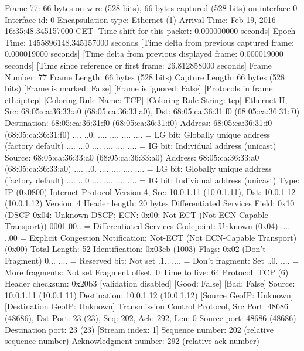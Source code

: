 Frame 77: 66 bytes on wire (528 bits), 66 bytes captured (528 bits) on interface 0
    Interface id: 0
    Encapsulation type: Ethernet (1)
    Arrival Time: Feb 19, 2016 16:35:48.345157000 CET
    [Time shift for this packet: 0.000000000 seconds]
    Epoch Time: 1455896148.345157000 seconds
    [Time delta from previous captured frame: 0.000019000 seconds]
    [Time delta from previous displayed frame: 0.000019000 seconds]
    [Time since reference or first frame: 26.812858000 seconds]
    Frame Number: 77
    Frame Length: 66 bytes (528 bits)
    Capture Length: 66 bytes (528 bits)
    [Frame is marked: False]
    [Frame is ignored: False]
    [Protocols in frame: eth:ip:tcp]
    [Coloring Rule Name: TCP]
    [Coloring Rule String: tcp]
Ethernet II, Src: 68:05:ca:36:33:a0 (68:05:ca:36:33:a0), Dst: 68:05:ca:36:31:f0 (68:05:ca:36:31:f0)
    Destination: 68:05:ca:36:31:f0 (68:05:ca:36:31:f0)
        Address: 68:05:ca:36:31:f0 (68:05:ca:36:31:f0)
        .... ..0. .... .... .... .... = LG bit: Globally unique address (factory default)
        .... ...0 .... .... .... .... = IG bit: Individual address (unicast)
    Source: 68:05:ca:36:33:a0 (68:05:ca:36:33:a0)
        Address: 68:05:ca:36:33:a0 (68:05:ca:36:33:a0)
        .... ..0. .... .... .... .... = LG bit: Globally unique address (factory default)
        .... ...0 .... .... .... .... = IG bit: Individual address (unicast)
    Type: IP (0x0800)
Internet Protocol Version 4, Src: 10.0.1.11 (10.0.1.11), Dst: 10.0.1.12 (10.0.1.12)
    Version: 4
    Header length: 20 bytes
    Differentiated Services Field: 0x10 (DSCP 0x04: Unknown DSCP; ECN: 0x00: Not-ECT (Not ECN-Capable Transport))
        0001 00.. = Differentiated Services Codepoint: Unknown (0x04)
        .... ..00 = Explicit Congestion Notification: Not-ECT (Not ECN-Capable Transport) (0x00)
    Total Length: 52
    Identification: 0x03eb (1003)
    Flags: 0x02 (Don't Fragment)
        0... .... = Reserved bit: Not set
        .1.. .... = Don't fragment: Set
        ..0. .... = More fragments: Not set
    Fragment offset: 0
    Time to live: 64
    Protocol: TCP (6)
    Header checksum: 0x20b3 [validation disabled]
        [Good: False]
        [Bad: False]
    Source: 10.0.1.11 (10.0.1.11)
    Destination: 10.0.1.12 (10.0.1.12)
    [Source GeoIP: Unknown]
    [Destination GeoIP: Unknown]
Transmission Control Protocol, Src Port: 48686 (48686), Dst Port: 23 (23), Seq: 202, Ack: 292, Len: 0
    Source port: 48686 (48686)
    Destination port: 23 (23)
    [Stream index: 1]
    Sequence number: 202    (relative sequence number)
    Acknowledgment number: 292    (relative ack number)
